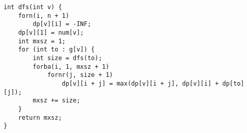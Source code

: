 \begin{verbatim}
int dfs(int v) {
	forn(i, n + 1)
		dp[v][i] = -INF;
	dp[v][1] = num[v];
	int mxsz = 1;
	for (int to : g[v]) {
		int size = dfs(to);
		forba(i, 1, mxsz + 1)
			fornr(j, size + 1)
				dp[v][i + j] = max(dp[v][i + j], dp[v][i] + dp[to][j]);
		mxsz += size;
	}
	return mxsz;
}
\end{verbatim}
